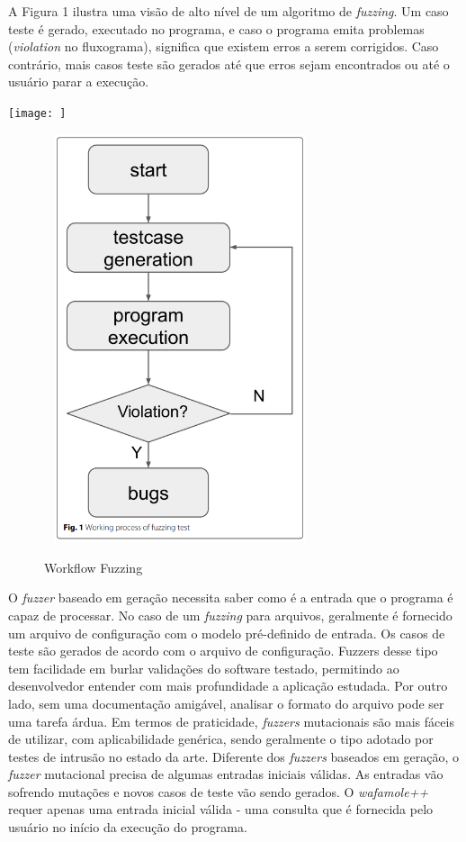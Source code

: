A Figura 1 ilustra uma visão de alto nível de um algoritmo de \textit{fuzzing}. Um caso teste é gerado, executado no programa, e caso o programa emita problemas (\textit{violation} no fluxograma), significa que existem erros a serem corrigidos. Caso contrário, mais casos teste são gerados até que erros sejam encontrados ou até o usuário parar a execução.

\texttt{[image: ]}
\begin{figure}[ht]
    \centering
    \caption{Workflow Fuzzing}
    \includegraphics[width=8cm,height=12cm,keepaspectratio]{figuras/fuzzing imagem.png} 
    \label{fig:internet} 
\end{figure}

O \textit{fuzzer} baseado em geração necessita saber como é a entrada que o programa é capaz de processar. No caso de um \textit{fuzzing} para arquivos, geralmente é fornecido um arquivo de configuração com o modelo pré-definido de entrada. Os casos de teste são gerados de acordo com o arquivo de configuração. Fuzzers desse tipo tem facilidade em burlar validações do software testado, permitindo ao desenvolvedor entender com mais profundidade a aplicação estudada. Por outro lado, sem uma documentação amigável, analisar o formato do arquivo pode ser uma tarefa árdua.
Em termos de praticidade, \textit{fuzzers} mutacionais são mais fáceis de utilizar, com aplicabilidade genérica, sendo geralmente o tipo adotado por testes de intrusão no estado da arte. Diferente dos \textit{fuzzers} baseados em geração, o \textit{fuzzer} mutacional precisa de algumas entradas iniciais válidas. As entradas vão sofrendo mutações e novos casos de teste vão sendo gerados. O \textit{wafamole++} requer apenas uma entrada inicial válida - uma consulta que é fornecida pelo usuário no início da execução do programa.

